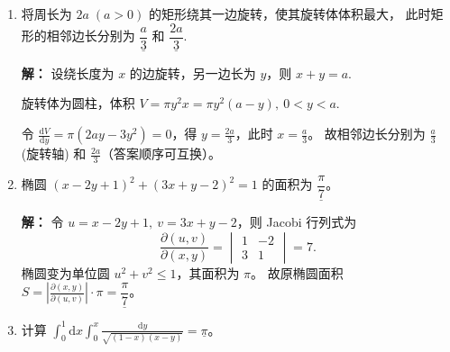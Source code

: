 \begin{enumerate}
\textbf{解：}
因为曲线光滑，故 $\nabla u = (u_x,u_y)\neq \mathbf{0}$。不妨设 $u_y\neq0$（若 $u_y=0$ 则必有 $u_x\neq0$，可利用 $x$ 对 $y$ 的隐函数类似推导，得到的公式在形式上关于 $x,y$ 对称）。

由隐函数求导法则：
\[
y' = -\frac{u_x}{u_y},\quad |y'| = \frac{|u_x|}{|u_y|}.
\]
继续求二阶导：
\[
y'' = -\frac{u_{xx}u_y^2 - 2u_{xy}u_xu_y + u_{yy}u_x^2}{u_y^3}.
\]
代入曲率公式：
\begin{align*}
\kappa &= \frac{|y''|}{(1+|y'|^2)^{3/2}}
= \frac{\bigl|u_{xx}u_y^2 - 2u_{xy}u_xu_y + u_{yy}u_x^2\bigr|}{|u_y|^3 \Bigl(1+\frac{u_x^2}{u_y^2}\Bigr)^{3/2}} \\
&= \frac{|u_{xx}u_y^2 - 2u_{xy}u_xu_y + u_{yy}u_x^2|}{(u_y^2+u_x^2)^{3/2}}.
\end{align*}
故答案为 $\underline{\dfrac{|u_{xx}u_y^2 - 2u_{xy}u_xu_y + u_{yy}u_x^2|}{(u_x^2+u_y^2)^{3/2}}}$。
（若 $u_y=0$，则由对称性公式不变。）

\item
将周长为 $2a\;(a>0)$ 的矩形绕其一边旋转，使其旋转体体积最大，
此时矩形的相邻边长分别为 $\underline{\dfrac{a}{3}}$ 和 $\underline{\dfrac{2a}{3}}$.

\textbf{解：}
设绕长度为 $x$ 的边旋转，另一边长为 $y$，则 $x+y=a$.

旋转体为圆柱，体积 $V = \pi y^2 x = \pi y^2(a-y),\ 0<y<a$.

令 $\displaystyle\frac{\mathrm{d}V}{\mathrm{d}y} = \pi(2ay - 3y^2)=0$，得 $\displaystyle y = \frac{2a}{3}$，此时 $\displaystyle x = \frac{a}{3}$。
故相邻边长分别为 $\displaystyle\frac{a}{3}$ (旋转轴) 和 $\displaystyle\frac{2a}{3}$（答案顺序可互换）。

\item
椭圆 $(x-2y+1)^2 + (3x+y-2)^2 = 1$ 的面积为 $\underline{\dfrac{\pi}{7}}$。

\textbf{解：}
令 $u = x-2y+1,\ v = 3x+y-2$，则 Jacobi 行列式为
\[
\frac{\partial(u,v)}{\partial(x,y)} = \begin{vmatrix} 1 & -2 \\ 3 & 1 \end{vmatrix} = 7.
\]
椭圆变为单位圆 $u^2+v^2\le 1$，其面积为 $\pi$。
故原椭圆面积 $\displaystyle S = \left|\frac{\partial(x,y)}{\partial(u,v)}\right|\cdot\pi = \underline{\dfrac{\pi}{7}}$。

\item
计算 $\displaystyle \int_{0}^{1}\mathrm{d}x\int_{0}^{x}\frac{\mathrm{d}y}{\sqrt{(1-x)(x-y)}} = \underline{\pi}$。


\end{enumerate}
